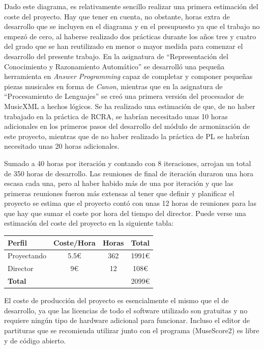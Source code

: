 Dado este diagrama, es relativamente sencillo realizar una primera estimación del coste del proyecto. Hay que tener en cuenta, no obstante, horas extra de desarrollo que se incluyen en el diagrama y en el presupuesto ya que el trabajo no empezó de cero, al haberse realizado dos prácticas durante los años tres y cuatro del grado que se han reutilizado en menor o mayor medida para comenzar el desarrollo del presente trabajo. En la asignatura de ``Representación del Conocimiento y Razonamiento Automático'' se desarrolló una pequeña herramienta en \textit{Answer Programming} capaz de completar y componer pequeñas piezas musicales en forma de \textit{Canon}, mientras que en la asignatura de ``Procesamiento de Lenguajes'' se creó una primera versión del procesador de MusicXML a hechos lógicos. Se ha realizado una estimación de que, de no haber trabajado en la práctica de RCRA, se habrían necesitado unas 10 horas adicionales en los primeros pasos del desarrollo del módulo de armonización de este proyecto, mientras que de no haber realizado la práctica de PL se habrían necesitado unas 20 horas adicionales.

Sumado a 40 horas por iteración y contando con 8 iteraciones, arrojan un total de 350 horas de desarrollo. Las reuniones de final de iteración duraron una hora escasa cada una, pero al haber habido más de una por iteración y que las primeras reuniones fueron más extensas al tener que definir y planificar el proyecto se estima que el proyecto contó con unas 12 horas de reuniones para las que hay que sumar el coste por hora del tiempo del director. Puede verse una estimación del coste del proyecto en la siguiente tabla:

\begin{center}
		\begin{tabular}{ | l | c | c | c |}
			\hline
			\textbf{Perfil} & \textbf{Coste/Hora} & \textbf{Horas} & \textbf{Total} \\ \hline
			Proyectando & 5.5\euro{} & 362 & 1991\euro{} \\ \hline
			Director  & 9\euro{} & 12 & 108\euro{} \\ \hline
			\textbf{Total} & & & 2099\euro{} \\ \hline
		\end{tabular}
\end{center}


El coste de producción del proyecto es esencialmente el mismo que el de desarrollo, ya que las licencias de todo el software utilizado son gratuitas y no requiere ningún tipo de hardware adicional para funcionar. Incluso el editor de partituras que se recomienda utilizar junto con el programa (MuseScore2) es libre y de código abierto.

